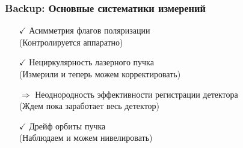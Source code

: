 \documentclass[12pt,aspectratio=169]{beamer}
\begin{document}
\begin{frame}[t]
\frametitle{Backup: Основные систематики измерений}
	\begin{itemize}
	\item[$\checkmark$]Асимметрия флагов поляризации\\ \textcolor{calmGreen}{(Контролируется аппаратно)}
	\item[$\checkmark$] Нециркулярность лазерного пучка \\
	\textcolor{calmGreen}{(Измерили и теперь можем корректировать)}
	\item[$\Rightarrow$] Неоднородность эффективности регистрации детектора \\
	\textcolor{calmRed}{(Ждем пока заработает весь детектор)}
	\item[$\checkmark$] Дрейф орбиты пучка \\
	\textcolor{calmGreen}{(Наблюдаем и можем нивелировать)}
\end{itemize}
\end{frame}
\end{document}
